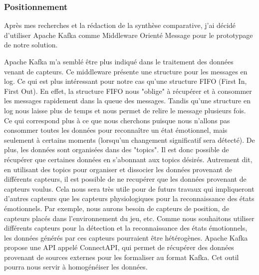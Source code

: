 \documentclass[11pt]{article}
\begin{document}
		\subsubsection{Positionnement}\label{sec:position}
			Après mes recherches et la rédaction de la synthèse comparative, j'ai décidé d'utiliser Apache Kafka comme Middleware Orienté Message pour le prototypage de notre solution.\par
			Apache Kafka m'a semblé être plus indiqué dans le traitement des données venant de capteurs.
			Ce middleware présente une structure pour les messages en log.
			Ce qui est plus intéressant pour notre cas qu'une structure FIFO (First In, First Out).
			En effet, la structure FIFO nous "oblige" à récupérer et à consommer les messages rapidement dans la queue des messages.
			Tandis qu'une structure en log nous laisse plus de temps et nous permet de relire le message plusieurs fois.
			Ce qui correspond plus à ce que nous cherchons puisque nous n'allons pas consommer toutes les données pour reconnaître un état émotionnel, mais seulement à certains moments (lorsqu'un changement significatif sera détecté). 
			De plus, les données sont organisées dans des "topics". 
			Il est donc possible de récupérer que certaines données en s'abonnant aux topics désirés.
			Autrement dit, en utilisant des topics pour organiser et dissocier les données provenant de différents capteurs, il est possible de ne recupérer que les données provenant de capteurs voulus.
			Cela nous sera très utile pour de futurs travaux qui impliqueront d'autres capteurs que les capteurs physiologiques pour la reconnaissance des états émotionnels.
			Par exemple, nous aurons besoin de capteurs de position, de capteurs placés dans l'environnement du jeu, etc.
			Comme nous souhaitons utiliser différents capteurs pour la détection et la reconnaissance des états émotionnels, les données générés par ces capteurs pourraient être hétérogènes. 
			Apache Kafka propose une API appelé ConnectAPI, qui permet de récupérer des données provenant de sources externes pour les formaliser au format Kafka.
			Cet outil pourra nous servir à homogénéiser les données.
\end{document}
